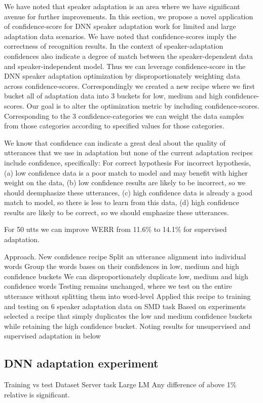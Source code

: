 
We have noted that speaker adaptation is an area where we have significant avenue for further improvements.
In this section, we propose a novel application of confidence-score for DNN speaker adaptation work for limited and large adaptation data scenarios. We have noted that confidence-scores imply the correctness of recognition results. In the context of speaker-adaptation confidences also indicate a degree of match between the speaker-dependent data and speaker-independent model. Thus we can leverage confidence-score in the DNN speaker adaptation optimization by disproportionately weighting data across confidence-scores. Correspondingly we created a new recipe where we first bucket all of adaptation data into 3 buckets for low, medium and high confidence-scores. Our goal is to alter the optimization metric by including confidence-scores. Corresponding to the 3 confidence-categories we can weight the data samples from those categories according to specified values for those categories.


We know that confidence can indicate a great deal about the quality of utterances that we use in adaptation but none of the current adaptation recipes include confidence, specifically:
For correct hypothesis	For incorrect hypothesis, (a) low confidence data is a poor match to model and may benefit with higher weight on the data, (b) low confidence results are likely to be incorrect, so we should deemphasize these utterances, (c) high confidence data is already a good match to model, so there is less to learn from this data, (d) high confidence results are likely to be correct, so we should emphasize these utterances.

For 50 utts we can improve WERR from 11.6\% to 14.1\% for supervised adaptation.

Approach. New confidence recipe 
Split an utterance alignment into individual words
Group the words bases on their confidences in low, medium and high confidence buckets
We can disproportionately duplicate low, medium and high confidence words
Testing remains unchanged, where we test on the entire utterance without splitting them into word-level
Applied this recipe to training and testing on 6 speaker adaptation data on SMD task
Based on experiments selected a recipe that simply duplicates the low and medium confidence buckets while retaining the high confidence bucket. Noting results for unsupervised and supervised adaptation in below

\subsection{DNN adaptation experiment}
Training vs test Dataset
Server task
Large LM
Any difference of above 1\% relative is significant.



